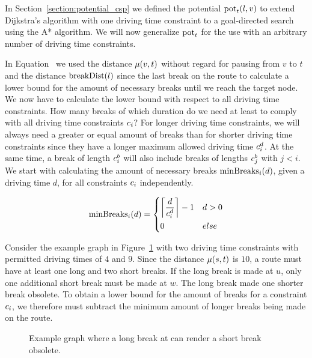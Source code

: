 In Section~\ref{section:potential_csp} we defined the potential $\concretepotential_t(l,v)$ to extend Dijkstra's algorithm with one driving time constraint to a goal-directed search using the A* algorithm. We will now generalize $\concretepotential_t$ for the use with an arbitrary number of driving time constraints.

In Equation~ we used the distance $\distance(v,t)$ without regard for pausing from $v$ to $t$ and the distance $\breakDist(l)$ since the last break on the route to calculate a lower bound for the amount of necessary breaks until we reach the target node. We now have to calculate the lower bound with respect to all driving time constraints. How many breaks of which duration do we need at least to comply with all driving time constraints $\restr_i$? For longer driving time constraints, we will always need a greater or equal amount of breaks than for shorter driving time constraints since they have a longer maximum allowed driving time $\restr_i^d$. At the same time, a break of length $\restr_i^b$ will also include breaks of lengths $\restr_j^b$ with $j < i$. We start with calculating the amount of necessary breaks $\minBreaks_i(d)$, given a driving time $d$, for all constraints $\restr_i$ independently.

\begin{align}\label{eq:min_breaks_n}
	\minBreaks_i(d) = \begin{dcases}
		\ceil*{ \frac{d}{\restr_i^d} } - 1 & d > 0 \\
		0                                  & else
	\end{dcases}
\end{align}

Consider the example graph in Figure~\ref{fig:graph_short_long_break} with two driving time constraints with permitted driving times of $4$ and $9$. Since the distance $\distance(s,t)$ is $10$, a route must have at least one long and two short breaks. If the long break is made at $u$, only one additional short break must be made at $w$. The long break made one shorter break obsolete. To obtain a lower bound for the amount of breaks for a constraint $\restr_i$, we therefore must subtract the minimum amount of longer breaks being made on the route.

\begin{figure}[hbtp]
	\centering
	
	\caption{Example graph where a long break at can render a short break obsolete.}
	\label{fig:graph_short_long_break}
\end{figure}

